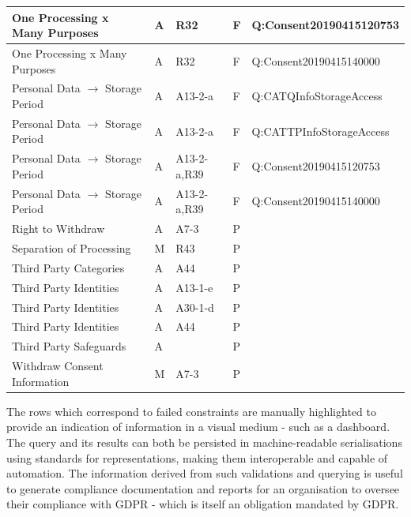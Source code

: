 \begin{center}
\begin{tabularx}{\linewidth}{|l|X|X|X|l|}
\rowcolor{lightred} One Processing x Many Purposes & A & R32 & F & Q:Consent20190415120753 \\ \hline
\rowcolor{lightred} One Processing x Many Purposes & A & R32 & F & Q:Consent20190415140000 \\ \hline
\rowcolor{lightred} Personal Data $\rightarrow$ Storage Period & A & A13-2-a & F & Q:CATQInfoStorageAccess \\ \hline
\rowcolor{lightred} Personal Data $\rightarrow$ Storage Period & A & A13-2-a & F & Q:CATTPInfoStorageAccess \\ \hline
\rowcolor{lightred} Personal Data $\rightarrow$ Storage Period & A & A13-2-a,R39 & F & Q:Consent20190415120753 \\ \hline
\rowcolor{lightred} Personal Data $\rightarrow$ Storage Period & A & A13-2-a,R39 & F & Q:Consent20190415140000 \\ \hline
Right to Withdraw & A & A7-3 & P &  \\ \hline
Separation of Processing & M & R43 & P &  \\ \hline
Third Party Categories & A & A44 & P &  \\ \hline
Third Party Identities & A & A13-1-e & P &  \\ \hline
Third Party Identities & A & A30-1-d & P &  \\ \hline
Third Party Identities & A & A44 & P &  \\ \hline
Third Party Safeguards & A &  & P &  \\ \hline
Withdraw Consent Information & M & A7-3 & P &  \\
\bottomrule
\end{tabularx}
\end{center}

The rows which correspond to failed constraints are manually highlighted to provide an indication of information in a visual medium - such as a dashboard.
The query and its results can both be persisted in machine-readable serialisations using standards for representations, making them interoperable and capable of automation.
The information derived from such validations and querying is useful to generate compliance documentation and reports for an organisation to oversee their compliance with GDPR - which is itself an obligation mandated by GDPR.


